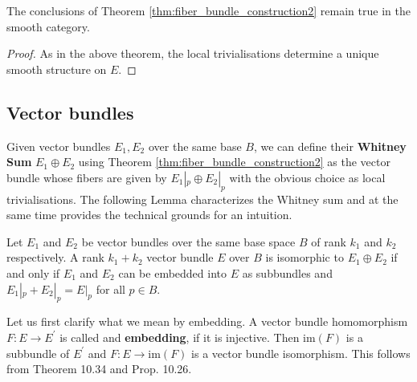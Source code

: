     \begin{theorem}
        \label{thm:fiber_bundle_construction2_smooth}
        The conclusions of Theorem \ref{thm:fiber_bundle_construction2} remain true in the smooth category. 
    \end{theorem}
    \begin{proof}
        As in the above theorem, the local trivialisations determine a unique smooth structure on $E$.
    \end{proof}

    \subsection{Vector bundles}


    Given vector bundles $E_1, E_2$ over the same base $B$, we can define their \textbf{Whitney Sum} $E_1 \oplus E_2$ using Theorem \ref{thm:fiber_bundle_construction2} as the vector bundle whose fibers are given by $E_1|_p \oplus E_2|_p$ with the obvious choice as local trivialisations. The following Lemma characterizes the Whitney sum and at the same time provides the technical grounds for an intuition.

    \begin{lemma}
        \label{lem:whitney_sum}
        Let $E_1$ and $E_2$ be vector bundles over the same base space $B$ of rank $k_1$ and $k_2$ respectively. A rank $k_1+k_2$ vector bundle $E$ over $B$ is isomorphic to $E_1 \oplus E_2$ if and only if $E_1$ and $E_2$ can be embedded into $E$ as subbundles and $E_1|_p + E_2|_p = E|_p$ for all $p \in B$.
    \end{lemma}

    Let us first clarify what we mean by embedding. A vector bundle homomorphism $F \colon E \to E^\prime$ is called and \textbf{embedding}, if it is injective. Then $\mathrm{im}(F)$ is a subbundle of $E^\prime$ and $F \colon E \to \mathrm{im}(F)$ is a vector bundle isomorphism. This follows from \cite{lee2011smooth} Theorem 10.34 and Prop. 10.26.

